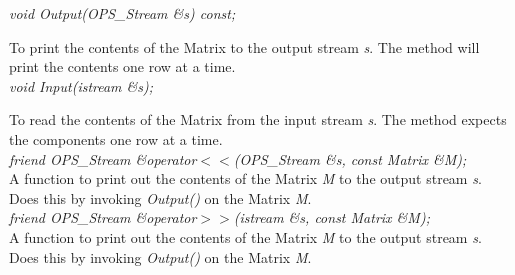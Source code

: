 {\em void Output(OPS_Stream \&s) const;} 

To print the contents of the Matrix to the output stream {\em s}. The
method will print the contents one row at a time. \\ 

{\em void Input(istream \&s);} 

To read the contents of the Matrix from the input stream {\em s}. The method expects the components one row at a time. \\

{\em friend OPS_Stream \&operator$<<$(OPS_Stream \&s, const Matrix \&M);} \\
A function to print out the contents of the Matrix {\em M} to the
output stream {\em s}. Does this by invoking {\em Output()} on the
Matrix {\em M}.\\ 

{\em friend OPS_Stream \&operator$>>$(istream \&s, const Matrix \&M);} \\
A function to print out the contents of the Matrix {\em M} to the
output stream {\em s}. Does this by invoking {\em Output()} on the
Matrix {\em M}.\\ 

